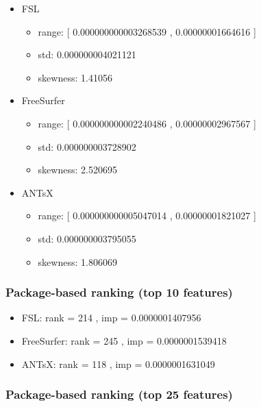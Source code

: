 \documentclass[
  10pt,
]{article}
\begin{document}
\begin{itemize}
\item
  FSL

  \begin{itemize}
  \item
    range: {[} 0.000000000003268539 , 0.00000001664616 {]}
  \item
    std: 0.000000004021121
  \item
    skewness: 1.41056
  \end{itemize}
\item
  FreeSurfer

  \begin{itemize}
  \item
    range: {[} 0.000000000002240486 , 0.00000002967567 {]}
  \item
    std: 0.000000003728902
  \item
    skewness: 2.520695
  \end{itemize}
\item
  ANTsX

  \begin{itemize}
  \item
    range: {[} 0.000000000005047014 , 0.00000001821027 {]}
  \item
    std: 0.000000003795055
  \item
    skewness: 1.806069
  \end{itemize}
\end{itemize}

\hypertarget{package-based-ranking-top-10-features-9}{%
\subsubsection{Package-based ranking (top 10
features)}\label{package-based-ranking-top-10-features-9}}

\begin{itemize}
\item
  FSL: rank = 214 , imp = 0.0000001407956
\item
  FreeSurfer: rank = 245 , imp = 0.0000001539418
\item
  ANTsX: rank = 118 , imp = 0.0000001631049
\end{itemize}

\hypertarget{package-based-ranking-top-25-features-9}{%
\subsubsection{Package-based ranking (top 25
features)}\label{package-based-ranking-top-25-features-9}}
\end{document}
